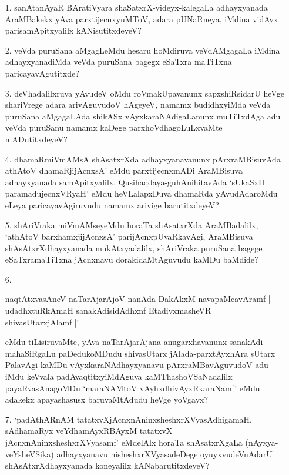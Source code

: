 \begin{itemize}
\item[1.] sanAtanAyaR BAratiVyara shaSatxrX-videyx-kalegaLa adhayxyanada AraMBakekx yAva parxtijecnxyuMToV, adara pUNaRneya, iMdina vidAyx parisamApitxyalilx kANisutitxdeyeV?

\item[2.] veVda puruSana aMgagLeMdu hesaru hoMdiruva veVdAMgagaLa iMdina adhayxyanadiMda veVda puruSana bagegx eSaTxra maTiTxna paricayavAgutitxde?

\item[3.] deVhadalilxruva yAvudeV oMdu roVmakUpavanunx sapxshiRsidarU heVge shariVrege adara arivAguvudoV hAgeyeV, namamx budidhxyiMda veVda puruSana aMgagaLAda shikASx vAyxkaraNAdigaLanunx muTiTxdAga adu veVda puruSanu namamx kaDege parxhoVdhagoLuLxvaMte mADutitxdeyeV?

\item[4.] dhamaRmiVmAMsA shAsatxrXda adhayxyanavanunx pArxraMBisuvAda 	athAtoV dhamaRjijAcnxsA' eMdu parxtijecnxmADi AraMBisuva adhayxyanada samApitxyalilx, Qusihaqdaya-guhAnihitavAda `sUkaSxH paramadujecnxVRyaH' eMdu heVLalapxDuva dhamaRda yAvudAdaroMdu eLeya paricayavAgiruvudu namamx arivige barutitxdeyeV?

\item[5.] shAriVraka miVmAMseyeMdu horaTa shAsatxrXda AraMBadalilx, `athAtoV barxhamxjijAcnxsA' parijAcnxpUvaRkavAgi, AraMBisuva shAsAtxrXdhayxyanada mukAtxyadalilx, shAriVraka puruSana bagege eSaTxramaTiTxna jAcnxnavu dorakidaMtAguvudu kaMDu baMdide?

\item[6.]
\begin{shloka}
naqtAtxvasAneV naTarAjarAjoV nanAda DakAkxM navapaMcavAramf |\\
udadhxtuRkAmaH sanakAdisidAdhxnf EtadivxmasheVR shivasUtarxjAlamf||'
\end{shloka}

eMdu tiLisiruvaMte, yAva naTarAjarAjana anugarxhavanunx sanakAdi mahaSiRgaLu paDedukoMDudu shivasUtarx jAlada-parxtAyxhAra sUtarx PalavAgi kaMDu vAyxkaraNAdhayxyanavu pArxraMBavAguvudoV adu iMdu keVvala padAvaqtitxyiMdAguva kaMThashoVSaNadalilx payaRvasAnagoMDu `maraNAMtoV vAyhxdhivAyxRkaraNamf' eMdu adakekx apayashasusx baruvaMtAdudu heVge yoVgayx?

\item[7.] `padAthARnAM tatatxvXjAcnxnAninxsheshxrXVyasAdhigamaH, sAdhamaRyx veYdhamAyxRBAyxM tatatxvX jAcnxnAninxsheshxrXVyasamf' eMdelAlx horaTa shAsatxrXgaLa (nAyxya-veYsheVSika) adhayxyanavu nisheshxrXVyasadeDege oyuyxvudeVnAdarU shAsAtxrXdhayxyanada koneyalilx kANabarutitxdeyeV?
\end{itemize}

